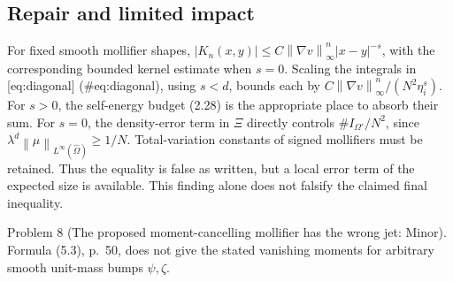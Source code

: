 \documentclass[10pt]{article}
\begin{document}
\subsection*{Repair and limited impact}
For fixed smooth mollifier shapes, \(|K_n(x,y)|\leq
C\left\lVert \nabla v\right\rVert_\infty^n|x-y|^{-s}\), with the corresponding bounded kernel estimate when \(s=0\). Scaling the integrals in [eq:diagonal] (\#eq:diagonal), using \(s<d\), bounds each by \(C\left\lVert \nabla v\right\rVert_\infty^n/(N^2\eta_i^s)\). For \(s>0\), the self-energy budget (2.28) is the appropriate place to absorb their sum. For \(s=0\), the density-error term in \(\Xi\) directly controls \(\#I_{\Omega'}/N^2\), since \(\lambda^d\left\lVert \mu\right\rVert_{L^\infty(\widehat\Omega)}\geq1/N\). Total-variation constants of signed mollifiers must be retained. Thus the equality is false as written, but a local error term of the expected size is available. This finding alone does not falsify the claimed final inequality.\par
Problem 8 (The proposed moment-cancelling mollifier has the wrong jet: Minor).  Formula (5.3), p. 50, does not give the stated vanishing moments for arbitrary smooth unit-mass bumps \(\psi,\zeta\).\par
\end{document}
